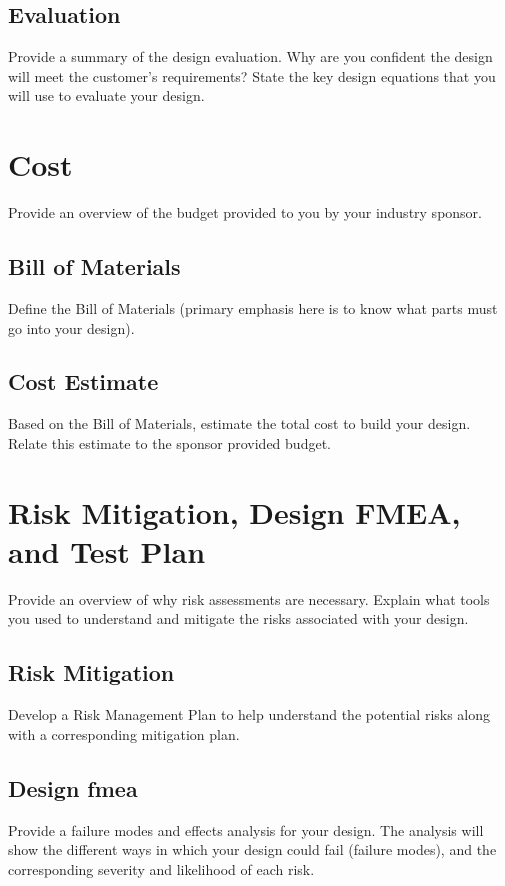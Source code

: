 \documentclass{ipfwpaper}
\begin{document}
\subsection{Evaluation}
Provide a summary of the design evaluation. Why are you confident the design will meet the customer's requirements? State the key design equations that you will use to evaluate your design. 


\clearpage
\section{Cost}
Provide an overview of the budget provided to you by your industry sponsor. 


\subsection{Bill of Materials}
Define the Bill of Materials (primary emphasis here is to know what parts must go into your design).



\subsection{Cost Estimate}
Based on the Bill of Materials, estimate the total cost to build your design. Relate this estimate to the sponsor provided budget.


\clearpage
\section{Risk Mitigation, Design FMEA, and Test Plan}
Provide an overview of why risk assessments are necessary. Explain what tools you used to understand and mitigate the risks associated with your design.

\subsection{Risk Mitigation}
Develop a Risk Management Plan to help understand the potential risks along with a corresponding mitigation plan.


\subsection{Design \gls{fmea}}
Provide a failure modes and effects analysis for your design. The analysis will show the different ways in which your design could fail (failure modes), and the corresponding severity and likelihood of each risk. 
\end{document}
